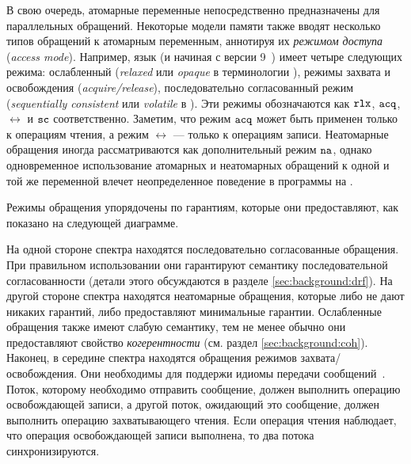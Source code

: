 В свою очередь, атомарные переменные непосредственно 
предназначены для параллельных обращений. 
Некоторые модели памяти также вводят 
несколько типов обращений к атомарным переменным,  аннотируя их 
 \emph{режимом доступа} (\emph{access mode}).
Например, язык \CPP (и \Java начиная с версии 9~\cite{Bender-Palsberg:OOPSLA19})
имеет четыре следующих режима: ослабленный (\emph{relaxed}
или \emph{opaque} в терминологии \Java),
режимы захвата и освобождения (\emph{acquire/release}), 
последовательно согласованный режим (\emph{sequentially consistent}
или  \emph{volatile} в \Java). 
Эти режимы обозначаются как $\mathtt{rlx}$, ${\mathtt{acq}}$, $\rel$ и ${\mathtt{sc}}$ соответственно.
Заметим, что режим ${\mathtt{acq}}$ может быть применен только к операциям чтения,
а режим $\rel$ --- только к операциям записи.
Неатомарные обращения иногда рассматриваются как дополнительный режим $\mathtt{na}$, 
однако  одновременное использование атомарных 
и неатомарных обращений к одной и той же переменной 
влечет неопределенное поведение в программы на \CPP.

Режимы обращения упорядочены по гарантиям, 
которые они предоставляют, как показано на следующей диаграмме. 




На одной стороне  спектра находятся последовательно согласованные обращения.
При правильном использовании они гарантируют семантику 
последовательной согласованности
(детали этого обсуждаются в разделе \cref{sec:background:drf}).
На другой стороне  спектра находятся неатомарные обращения, которые либо не дают никаких гарантий, 
либо предоставляют минимальные гарантии. 
Ослабленные обращения также имеют слабую семантику, 
тем не менее обычно они предоставляют свойство \emph{когерентности}
(см. раздел \cref{sec:background:coh}).
Наконец, в середине спектра находятся обращения режимов захвата/освобождения. 
Они необходимы для поддержи идиомы передачи сообщений~\cite{Lahav-al:POPL16}.
Поток, которому необходимо отправить сообщение, должен выполнить операцию освобождающей записи, 
а другой поток, ожидающий это сообщение, должен выполнить операцию захватывающего чтения. 
Если операция чтения наблюдает, что  операция освобождающей записи выполнена, то два потока синхронизируются.

